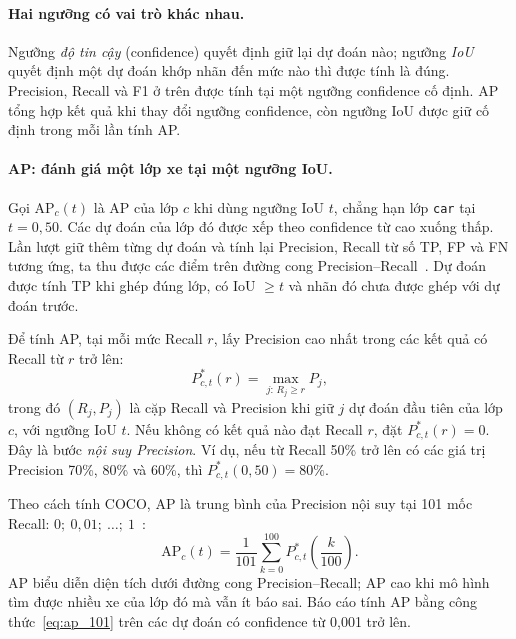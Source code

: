 \paragraph{Hai ngưỡng có vai trò khác nhau.}
Ngưỡng \emph{độ tin cậy} (confidence) quyết định giữ lại dự đoán nào; ngưỡng \emph{IoU} quyết định một dự đoán khớp nhãn đến mức nào thì được tính là đúng.
Precision, Recall và F1 ở trên được tính tại một ngưỡng confidence cố định. AP tổng hợp kết quả khi thay đổi ngưỡng confidence, còn ngưỡng IoU được giữ cố định trong mỗi lần tính AP.

\paragraph{AP: đánh giá một lớp xe tại một ngưỡng IoU.}
Gọi $\mathrm{AP}_c(t)$ là AP của lớp $c$ khi dùng ngưỡng IoU $t$, chẳng hạn lớp \texttt{car} tại $t=0{,}50$.
Các dự đoán của lớp đó được xếp theo confidence từ cao xuống thấp. Lần lượt giữ thêm từng dự đoán và tính lại Precision, Recall từ số TP, FP và FN tương ứng, ta thu được các điểm trên đường cong Precision--Recall~\cite{everingham2010voc,padilla2021metrics}.
Dự đoán được tính TP khi ghép đúng lớp, có IoU $\ge t$ và nhãn đó chưa được ghép với dự đoán trước.

Để tính AP, tại mỗi mức Recall $r$, lấy Precision cao nhất trong các kết quả có Recall từ $r$ trở lên:
\begin{equation}
  P^*_{c,t}(r)=\max_{j:\,R_j\ge r} P_j,
  \label{eq:ap_precision}
\end{equation}
trong đó $(R_j,P_j)$ là cặp Recall và Precision khi giữ $j$ dự đoán đầu tiên của lớp $c$, với ngưỡng IoU $t$.
Nếu không có kết quả nào đạt Recall $r$, đặt $P^*_{c,t}(r)=0$.
Đây là bước \emph{nội suy Precision}. Ví dụ, nếu từ Recall 50\% trở lên có các giá trị Precision 70\%, 80\% và 60\%, thì $P^*_{c,t}(0{,}50)=80\%$.

Theo cách tính COCO, AP là trung bình của Precision nội suy tại 101 mốc Recall: $0;\ 0{,}01;\ \ldots;\ 1$~\cite{padilla2021metrics}:
\begin{equation}
  \mathrm{AP}_c(t)=\frac{1}{101}\sum_{k=0}^{100}
  P^*_{c,t}\!\left(\frac{k}{100}\right).
  \label{eq:ap_101}
\end{equation}
AP biểu diễn diện tích dưới đường cong Precision--Recall; AP cao khi mô hình tìm được nhiều xe của lớp đó mà vẫn ít báo sai.
Báo cáo tính AP bằng công thức~\eqref{eq:ap_101} trên các dự đoán có confidence từ 0,001 trở lên.


